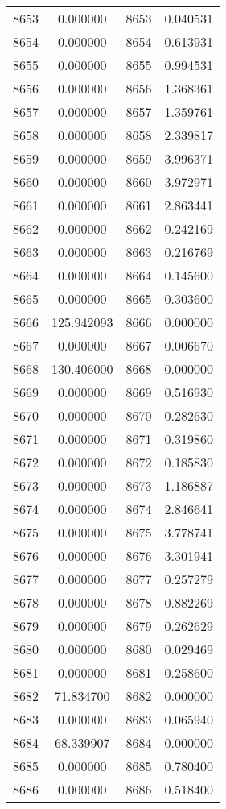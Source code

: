 \documentclass[12pt]{article}
\begin{document}
\begin{longtable}{@{}cccc@{}}
8653 & 0.000000 & 8653 & 0.040531 \\
8654 & 0.000000 & 8654 & 0.613931 \\
8655 & 0.000000 & 8655 & 0.994531 \\
8656 & 0.000000 & 8656 & 1.368361 \\
8657 & 0.000000 & 8657 & 1.359761 \\
8658 & 0.000000 & 8658 & 2.339817 \\
8659 & 0.000000 & 8659 & 3.996371 \\
8660 & 0.000000 & 8660 & 3.972971 \\
8661 & 0.000000 & 8661 & 2.863441 \\
8662 & 0.000000 & 8662 & 0.242169 \\
8663 & 0.000000 & 8663 & 0.216769 \\
8664 & 0.000000 & 8664 & 0.145600 \\
8665 & 0.000000 & 8665 & 0.303600 \\
8666 & 125.942093 & 8666 & 0.000000 \\
8667 & 0.000000 & 8667 & 0.006670 \\
8668 & 130.406000 & 8668 & 0.000000 \\
8669 & 0.000000 & 8669 & 0.516930 \\
8670 & 0.000000 & 8670 & 0.282630 \\
8671 & 0.000000 & 8671 & 0.319860 \\
8672 & 0.000000 & 8672 & 0.185830 \\
8673 & 0.000000 & 8673 & 1.186887 \\
8674 & 0.000000 & 8674 & 2.846641 \\
8675 & 0.000000 & 8675 & 3.778741 \\
8676 & 0.000000 & 8676 & 3.301941 \\
8677 & 0.000000 & 8677 & 0.257279 \\
8678 & 0.000000 & 8678 & 0.882269 \\
8679 & 0.000000 & 8679 & 0.262629 \\
8680 & 0.000000 & 8680 & 0.029469 \\
8681 & 0.000000 & 8681 & 0.258600 \\
8682 & 71.834700 & 8682 & 0.000000 \\
8683 & 0.000000 & 8683 & 0.065940 \\
8684 & 68.339907 & 8684 & 0.000000 \\
8685 & 0.000000 & 8685 & 0.780400 \\
8686 & 0.000000 & 8686 & 0.518400 \\

\end{longtable}
\end{document}
